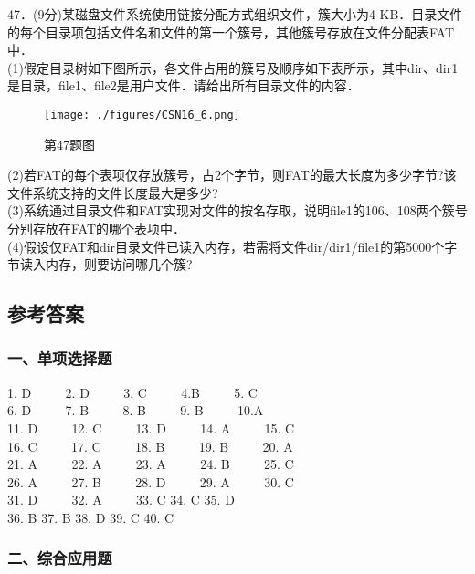 47．(9分)某磁盘文件系统使用链接分配方式组织文件，簇大小为4 KB．目录文件的每个目录项包括文件名和文件的第一个簇号，其他簇号存放在文件分配表FAT中． \\
(1)假定目录树如下图所示，各文件占用的簇号及顺序如下表所示，其中dir、dir1是目录，file1、file2是用户文件．请给出所有目录文件的内容． \\
\begin{figure}[ht]
\centering
\texttt{[image: ./figures/CSN16\_6.png]}
\caption{第47题图} \label{CSN16_fig6}
\end{figure}
(2)若FAT的每个表项仅存放簇号，占2个字节，则FAT的最大长度为多少字节?该文件系统支持的文件长度最大是多少? \\
(3)系统通过目录文件和FAT实现对文件的按名存取，说明file1的106、108两个簇号分别存放在FAT的哪个表项中． \\
(4)假设仅FAT和dir目录文件已读入内存，若需将文件dir/dir1/file1的第5000个字节读入内存，则要访问哪几个簇?

\subsection{参考答案}
\subsubsection{一、单项选择题}
1. D  $\qquad$ 2. D $\qquad$ 3. C $\qquad$ 4.B $\qquad$ 5. C \\
6. D $\qquad$ 7. B $\qquad$ 8. B $\qquad$ 9. B $\qquad$ 10.A \\
11. D $\qquad$ 12. C $\qquad$ 13. D $\qquad$ 14. A $\qquad$ 15. C \\
16. C $\qquad$ 17. C $\qquad$ 18. B $\qquad$ 19. B $\qquad$ 20. A \\
21. A $\qquad$ 22. A $\qquad$ 23. A $\qquad$ 24. B $\qquad$ 25. C \\
26. A $\qquad$ 27. B $\qquad$ 28. D $\qquad$ 29. A $\qquad$ 30. C \\
31. D $\qquad$ 32. A $\qquad$ 33. C 34. C 35. D \\
36. B 37. B 38. D 39. C 40. C

\subsubsection{二、综合应用题}
